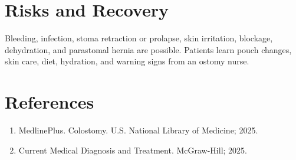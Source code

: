 \section*{Risks and Recovery}
Bleeding, infection, stoma retraction or prolapse, skin irritation, blockage, dehydration, and parastomal hernia are possible. Patients learn pouch changes, skin care, diet, hydration, and warning signs from an ostomy nurse.

\section*{References}
\begin{enumerate}
  \item MedlinePlus. Colostomy. U.S. National Library of Medicine; 2025.
  \item Current Medical Diagnosis and Treatment. McGraw-Hill; 2025.
\end{enumerate}
\clearpage
